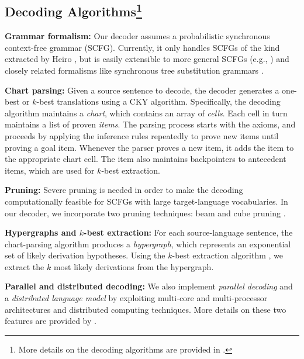\documentclass[11pt]{article}
\begin{document}
\subsection{Decoding Algorithms\footnote{More details on the decoding algorithms are provided in \cite{Li2008b}.}}

\textbf{Grammar formalism:} Our decoder assumes a probabilistic synchronous context-free grammar (SCFG). Currently, it only handles SCFGs of the kind extracted by Heiro \cite{Chiang2007}, but is easily extensible to more general SCFGs (e.g., \cite{Galley2006}) and closely related formalisms like synchronous tree substitution grammars \cite{Eisner2003}.


\textbf{Chart parsing:} Given a source sentence to decode, the decoder generates a one-best or $k$-best translations using a CKY algorithm. Specifically,
the decoding algorithm  maintains a \emph{chart}, which contains an array of \emph{cells}. Each cell in turn maintains a list of proven \emph{items}. The parsing process starts with the axioms, and proceeds by applying the inference rules repeatedly to prove new items until proving a goal item. Whenever the parser proves a new item, it adds the item to the appropriate chart cell. The item also maintains backpointers to antecedent items, which are used for $k$-best extraction.

\textbf{Pruning:} Severe pruning is needed in order to make the decoding computationally feasible for SCFGs with large target-language vocabularies. In our decoder, we incorporate two pruning techniques: beam and cube pruning \cite{Chiang2007}.

\textbf{Hypergraphs and $k$-best extraction:}
For each source-language sentence, the chart-parsing algorithm produces a \emph{hypergraph}, which represents an exponential set of likely derivation hypotheses. Using the $k$-best extraction algorithm \cite{Huang2005}, we extract the $k$ most likely derivations from the hypergraph.

\textbf{Parallel and distributed decoding:}
We also implement \emph{parallel decoding} and a \emph{distributed language model} by exploiting multi-core and multi-processor architectures and distributed computing techniques. More details on these two features are provided by .
\end{document}
